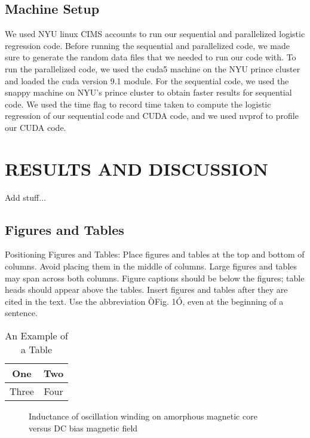 \documentclass[letterpaper, 10 pt, conference]{ieeeconf}  %
\begin{document}
\subsection{Machine Setup}

We used NYU linux CIMS accounts to run our sequential and parallelized logistic regression code. Before running the sequential and parallelized code, we made sure to generate the random data files that we needed to run our code with. To run the parallelized code, we used the cuda5 machine on the NYU prince cluster and loaded the cuda version 9.1 module. For the sequential code, we used the snappy machine on NYU’s prince cluster to obtain faster results for sequential code. We used the time flag to record time taken to compute the logistic regression of our sequential code and CUDA code, and we used nvprof to profile our CUDA code. 

\section{RESULTS AND DISCUSSION}
Add stuff...

\subsection{Figures and Tables}

Positioning Figures and Tables: Place figures and tables at the top and bottom of columns. Avoid placing them in the middle of columns. Large figures and tables may span across both columns. Figure captions should be below the figures; table heads should appear above the tables. Insert figures and tables after they are cited in the text. Use the abbreviation ÒFig. 1Ó, even at the beginning of a sentence.

\begin{table}[h]
\caption{An Example of a Table}
\label{table_example}
\begin{center}
\begin{tabular}{|c||c|}
\hline
One & Two\\
\hline
Three & Four\\
\hline
\end{tabular}
\end{center}
\end{table}


   \begin{figure}[thpb]
      \centering
      \caption{Inductance of oscillation winding on amorphous
       magnetic core versus DC bias magnetic field}
      \label{figurelabel}
   \end{figure}
   
\end{document}
